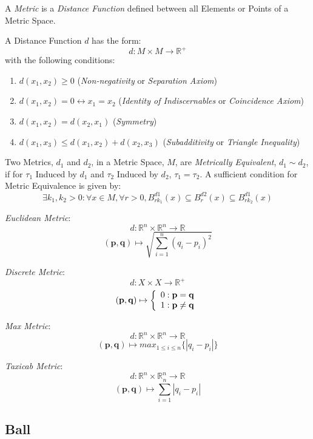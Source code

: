 A \emph{Metric} is a \emph{Distance Function} defined between all
Elements or Points of a Metric Space.

A Distance Function $d$ has the form:
\[
    d: M \times M \rightarrow \mathbb{R}^{+}
\]
with the following conditions:
\begin{enumerate}
\item $d(x_1, x_2) \geq 0$ (\emph{Non-negativity} or \emph{Separation
  Axiom})
\item $d(x_1, x_2) = 0 \leftrightarrow x_1 = x_2$ (\emph{Identity of
  Indiscernables} or \emph{Coincidence Axiom})
\item $d(x_1, x_2) = d(x_2, x_1)$ (\emph{Symmetry})
\item $d(x_1, x_3) \leq d(x_1, x_2) + d(x_2, x_3)$
  (\emph{Subadditivity} or \emph{Triangle Inequality})
\end{enumerate}
Two Metrics, $d_1$ and $d_2$, in a Metric Space, $M$, are
\emph{Metrically Equivalent}, $d_1 \sim d_2$, if for $\tau_1$ Induced
by $d_1$ and $\tau_2$ Induced by $d_2$, $\tau_1 = \tau_2$. A
sufficient condition for Metric Equivalence is given by:
\[
    \exists k_1, k_2 > 0 : \forall x \in M, \forall r > 0,
    B^{d1}_{rk_1}(x) \subseteq B^{d2}_r (x) \subseteq B^{d1}_{rk_2}(x)
\]

\emph{Euclidean Metric}:
\[
    d: \mathbb{R}^n \times \mathbb{R}^n \rightarrow \mathbb{R}
\]\[
    (\mathbf{p},\mathbf{q}) \mapsto \sqrt{\sum_{i=1}^{n}(q_i - p_i)^2}
\]

\emph{Discrete Metric}:
\[
    d: X \times X \rightarrow \mathbb{R}^{+}
\]\[
    (\mathbf{p},\mathbf{q}) \mapsto \left\{
    \begin{array}{l l}
        0: \mathbf{p} = \mathbf{q}\\
        1: \mathbf{p} \neq \mathbf{q}
    \end{array}\right.
\]

\emph{Max Metric}:
\[
    d: \mathbb{R}^n \times \mathbb{R}^n \rightarrow \mathbb{R}
\]\[
    (\mathbf{p},\mathbf{q}) \mapsto max_{1 \leq i \leq n}\{|q_i - p_i|\}
\]

\emph{Taxicab Metric}:
\[
    d: \mathbb{R}^n \times \mathbb{R}^n \rightarrow \mathbb{R}
\]\[
    (\mathbf{p},\mathbf{q}) \mapsto \sum_{i=1}^{n}|q_i - p_i|
\]



\subsection{Ball}\label{sec:metric_ball}

